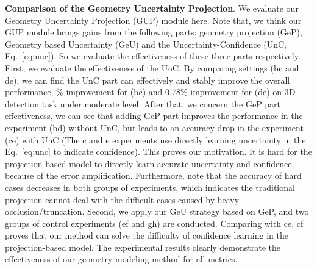 \documentclass[10pt,twocolumn,letterpaper]{article}
\begin{document}
\noindent
{\bf Comparison of the Geometry Uncertainty Projection}.
We evaluate our Geometry Uncertainty Projection (GUP) module here. Note that, we think our GUP module brings gains from the following parts: geometry projection (GeP), Geometry based Uncertainty (GeU) and the Uncertainty-Confidence (UnC, Eq.~\ref{eq:unc}). So we evaluate the effectiveness of these three parts respectively. 
First, we evaluate the effectiveness of the UnC. By comparing settings (bc and de), we can find the UnC part can effectively and stably improve the overall performance, \% improvement for (bc) and 0.78\% improvement for (de) on 3D detection task under moderate level. After that, we concern the GeP part effectiveness, we can see that adding GeP part improves the performance in the experiment (bd) without UnC, but leads to an accuracy drop in the experiment (ce) with UnC (The c and e experiments use directly learning uncertainty in the Eq.~\ref{eq:unc} to indicate confidence).
This proves our motivation. It is hard for the projection-based model to directly learn accurate uncertainty and confidence because of the error amplification. 
Furthermore, note that the accuracy of hard cases decreases in both groups of experiments, which indicates the traditional projection cannot deal with the difficult cases caused by heavy occlusion/truncation.
Second, we apply our GeU strategy based on GeP, and two groups of control experiments (ef and gh) are conducted. Comparing with ce, cf proves that our method can solve the difficulty of confidence learning in the projection-based model. 
The experimental results clearly demonstrate the effectiveness of our geometry modeling method for all metrics.
\end{document}
